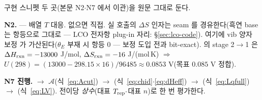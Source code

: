 구현 스니펫 두 곳(본문 N2$\cdot$N7 에서 이관)을 원문 그대로 둔다.
\begin{codebox}
\textbf{N2.} 
--- 배열 $T$ 대응. 없으면  직접. 실 호출의 $\Delta S$ 인자는 seam
 를 경유한다(흑연 base 는 항등으로  그대로 ---
LCO 전자항 plug-in 자리: \S\ref{sec:lco-code}). 여기에 vib 양자 보정  가
가산된다($\theta_E$ 부재 시 항등 $0$ --- 보정 도입 전과 bit-exact).  의 stage 2$\to$1 은
$\Delta H_{\mathrm{rxn}}=-13000$ J/mol, $\Delta S_{\mathrm{rxn}}=-16$ J/(mol\,K) $\Rightarrow$ $U(298)=(13000-298.15\times16)/96485
\approx0.0853$ V(목표 $0.085$ V 정합).
\end{codebox}
\begin{codebox}
\textbf{N7 진행.}  $\to$ $\mathcal A$(식~\eqref{eq:Acut}) $\to$
 (식~\eqref{eq:chid}$\cdot$\eqref{eq:dHeff}) $\to$
 (식~\eqref{eq:Lqfull}) $\to$  (식~\eqref{eq:LV}).
전이당 \emph{상수}(대표 $T_{\mathrm{rep}}\cdot$대표 $n$)로 한 번 평가한다.
\end{codebox}

